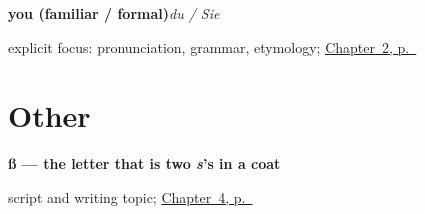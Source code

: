 \noindent\begin{minipage}[t]{\linewidth}
\raggedright
\textbf{you (familiar / formal)}\enspace\emph{du / Sie}\par
\footnotesize explicit focus: pronunciation, grammar, etymology; \hyperref[ch:introductions]{Chapter~2, p.~\pageref*{ch:introductions}}
\end{minipage}\par\smallskip

\section*{Other}

\noindent\begin{minipage}[t]{\linewidth}
\raggedright
\textbf{ß — the letter that is two \emph{s}'s in a coat}\par
\footnotesize script and writing topic; \hyperref[ch:farewells]{Chapter~4, p.~\pageref*{ch:farewells}}
\end{minipage}\par\smallskip
